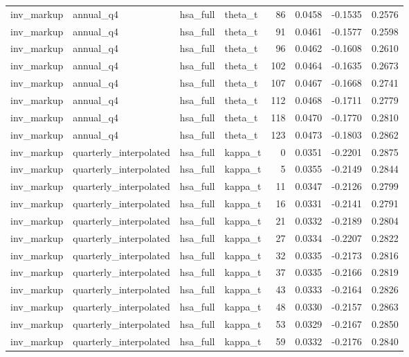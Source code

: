 \begin{tabular}{llllrrrr}
inv\_markup & annual\_q4 & hsa\_full & theta\_t & 86 & 0.0458 & -0.1535 & 0.2576 \\
inv\_markup & annual\_q4 & hsa\_full & theta\_t & 91 & 0.0461 & -0.1577 & 0.2598 \\
inv\_markup & annual\_q4 & hsa\_full & theta\_t & 96 & 0.0462 & -0.1608 & 0.2610 \\
inv\_markup & annual\_q4 & hsa\_full & theta\_t & 102 & 0.0464 & -0.1635 & 0.2673 \\
inv\_markup & annual\_q4 & hsa\_full & theta\_t & 107 & 0.0467 & -0.1668 & 0.2741 \\
inv\_markup & annual\_q4 & hsa\_full & theta\_t & 112 & 0.0468 & -0.1711 & 0.2779 \\
inv\_markup & annual\_q4 & hsa\_full & theta\_t & 118 & 0.0470 & -0.1770 & 0.2810 \\
inv\_markup & annual\_q4 & hsa\_full & theta\_t & 123 & 0.0473 & -0.1803 & 0.2862 \\
inv\_markup & quarterly\_interpolated & hsa\_full & kappa\_t & 0 & 0.0351 & -0.2201 & 0.2875 \\
inv\_markup & quarterly\_interpolated & hsa\_full & kappa\_t & 5 & 0.0355 & -0.2149 & 0.2844 \\
inv\_markup & quarterly\_interpolated & hsa\_full & kappa\_t & 11 & 0.0347 & -0.2126 & 0.2799 \\
inv\_markup & quarterly\_interpolated & hsa\_full & kappa\_t & 16 & 0.0331 & -0.2141 & 0.2791 \\
inv\_markup & quarterly\_interpolated & hsa\_full & kappa\_t & 21 & 0.0332 & -0.2189 & 0.2804 \\
inv\_markup & quarterly\_interpolated & hsa\_full & kappa\_t & 27 & 0.0334 & -0.2207 & 0.2822 \\
inv\_markup & quarterly\_interpolated & hsa\_full & kappa\_t & 32 & 0.0335 & -0.2173 & 0.2816 \\
inv\_markup & quarterly\_interpolated & hsa\_full & kappa\_t & 37 & 0.0335 & -0.2166 & 0.2819 \\
inv\_markup & quarterly\_interpolated & hsa\_full & kappa\_t & 43 & 0.0333 & -0.2164 & 0.2826 \\
inv\_markup & quarterly\_interpolated & hsa\_full & kappa\_t & 48 & 0.0330 & -0.2157 & 0.2863 \\
inv\_markup & quarterly\_interpolated & hsa\_full & kappa\_t & 53 & 0.0329 & -0.2167 & 0.2850 \\
inv\_markup & quarterly\_interpolated & hsa\_full & kappa\_t & 59 & 0.0332 & -0.2176 & 0.2840 \\

\end{tabular}
